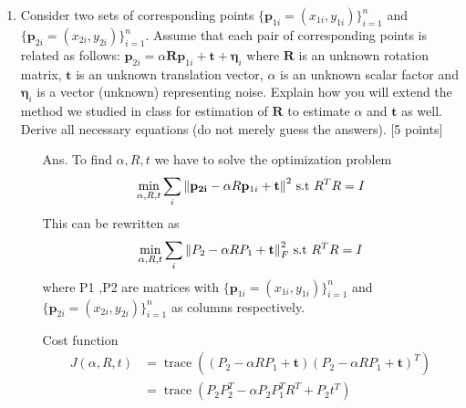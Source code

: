 \documentclass[11pt]{article}
\newcommand{\norm}[1]{\left\lVert#1\right\rVert}
\newcommand{\tr}{\operatorname{trace}}
\begin{document}
\begin{enumerate}
\item Consider two sets of corresponding points $\{\mathbf{p}_{1i} = (x_{1i},y_{1i})\}_{i=1}^{n}$ and $\{\mathbf{p}_{2i} = (x_{2i},y_{2i})\}_{i=1}^{n}$. Assume that each pair of corresponding points is related as follows: $\mathbf{p}_{2i} = \alpha \mathbf{R} \mathbf{p}_{1i} + \mathbf{t} + \mathbf{\eta}_i$ where $\mathbf{R}$ is an unknown rotation matrix, $\mathbf{t}$ is an unknown translation vector, $\alpha$ is an unknown scalar factor and $\mathbf{\eta}_i$ is a vector (unknown) representing noise. Explain how you will extend the method we studied in class for estimation of $\mathbf{R}$ to estimate $\alpha$ and $\mathbf{t}$ as well. Derive all necessary equations (do not merely guess the answers). \textsf{[5 points]}
\begin{itemize}
	\item[Ans.] To find $\alpha,R,t$ we have to solve the optimization problem 
	\[
		\min_{\alpha,R,t} \sum_i{\norm{\mathbf{{p}_{2i}} - \alpha R \mathbf{p}_{1i} + \mathbf{t}}}^2
		\textnormal{  s.t  } R^TR = I
	\]
	This can be rewritten as 
	\[
		\min_{\alpha,R,t} \sum_i{\norm{P_2 - \alpha R P_1 + \mathbf{t}}}_F^2
		\textnormal{  s.t  } R^TR = I
	\] where P1 ,P2 are matrices with  $\{\mathbf{p}_{1i} = (x_{1i},y_{1i})\}_{i=1}^{n}$ and $\{\mathbf{p}_{2i} = (x_{2i},y_{2i})\}_{i=1}^{n}$ as columns respectively.

	Cost function 
	\begin{align*}
	J(\alpha,R,t) &= \tr( (P_2 - \alpha R P_1 + \mathbf{t})(P_2 - \alpha R P_1 + \mathbf{t}) ^T  )\\
	&= \tr(P_2P_2^T -\alpha P_2P_1^TR^T + P_2t^T )
	\end{align*}
\end{itemize}


\end{enumerate}
\end{document}
